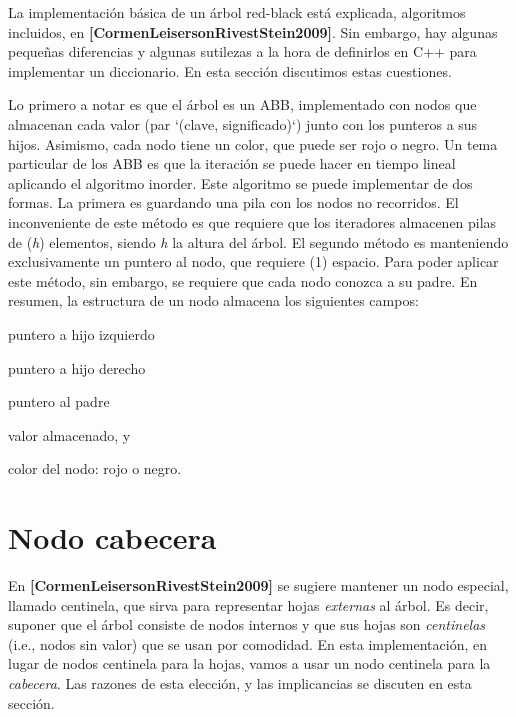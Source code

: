 \-La implementación básica de un árbol red-\/black está explicada, algoritmos incluidos, en {\bfseries [\-Cormen\-Leiserson\-Rivest\-Stein2009]}. \-Sin embargo, hay algunas pequeñas diferencias y algunas sutilezas a la hora de definirlos en \-C++ para implementar un diccionario. \-En esta sección discutimos estas cuestiones.

\-Lo primero a notar es que el árbol es un \-A\-B\-B, implementado con nodos que almacenan cada valor (par `(clave, significado)`) junto con los punteros a sus hijos. \-Asimismo, cada nodo tiene un color, que puede ser rojo o negro. \-Un tema particular de los \-A\-B\-B es que la iteración se puede hacer en tiempo lineal aplicando el algoritmo inorder. \-Este algoritmo se puede implementar de dos formas. \-La primera es guardando una pila con los nodos no recorridos. \-El inconveniente de este método es que requiere que los iteradores almacenen pilas de ({\itshape h\/}) elementos, siendo {\itshape h\/} la altura del árbol. \-El segundo método es manteniendo exclusivamente un puntero al nodo, que requiere (1) espacio. \-Para poder aplicar este método, sin embargo, se requiere que cada nodo conozca a su padre. \-En resumen, la estructura de un nodo almacena los siguientes campos\-:
\begin{DoxyItemize}
\item puntero a hijo izquierdo
\item puntero a hijo derecho
\item puntero al padre
\item valor almacenado, y
\item color del nodo\-: rojo o negro.
\end{DoxyItemize}\hypertarget{Implementacion_Cabecera}{}\section{\-Nodo cabecera}\label{Implementacion_Cabecera}
\-En {\bfseries [\-Cormen\-Leiserson\-Rivest\-Stein2009]} se sugiere mantener un nodo especial, llamado centinela, que sirva para representar hojas {\itshape externas\/} al árbol. \-Es decir, suponer que el árbol consiste de nodos internos y que sus hojas son {\itshape centinelas\/} (i.\-e., nodos sin valor) que se usan por comodidad. \-En esta implementación, en lugar de nodos centinela para la hojas, vamos a usar un nodo centinela para la {\itshape cabecera\/}. \-Las razones de esta elección, y las implicancias se discuten en esta sección.

